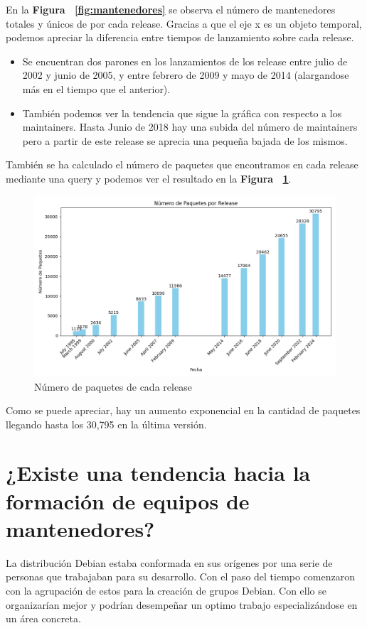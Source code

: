 \documentclass[a4paper, 12pt]{book}
\begin{document}
En la  \textbf{Figura ~\ref{fig:mantenedores}} se observa el número de mantenedores totales y únicos de por cada release. 
Gracias a que el eje x es un objeto temporal, podemos apreciar la diferencia entre tiempos de lanzamiento sobre cada release.
	\begin{itemize}
	\item  Se encuentran dos parones en los lanzamientos de los release entre julio de 2002 y junio de 2005, y entre febrero de 2009 y mayo de 2014 (alargandose más en el tiempo que el anterior).
	
	\item También podemos ver la tendencia que sigue la gráfica con respecto a los maintainers. Hasta Junio de 2018 hay una subida del número de maintainers pero a partir de este release se aprecia una pequeña bajada de los mismos.
\end{itemize}

También se ha calculado el número de paquetes que encontramos en cada release mediante una query y podemos ver el resultado en la \textbf{Figura ~\ref{fig:paquetes}}.

\begin{figure}
	\centering
	\includegraphics[width=15cm, keepaspectratio]{img/paquetes_releases.png}
	\caption{Número de paquetes de cada release}
	\label{fig:paquetes}
\end{figure}

Como se puede apreciar, hay un aumento exponencial en la cantidad de paquetes llegando hasta los 30,795 en la última versión.

\section{¿Existe una tendencia hacia la formación de equipos de mantenedores?}
\label{sec:pregunta_2}
La distribución Debian estaba conformada en sus orígenes por una serie de personas que trabajaban para su desarrollo. Con el paso del tiempo comenzaron con la agrupación de estos para la creación de grupos Debian. Con ello se organizarían mejor y podrían desempeñar un optimo trabajo especializándose en un área concreta.
\end{document}
